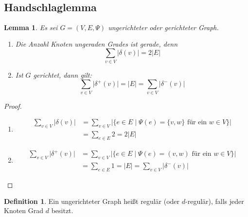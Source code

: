 \documentclass[a4paper,12pt]{article}
\newtheorem{lemma}[axiom]{Lemma}
\theoremstyle{definition}
\newtheorem{definition}[axiom]{Definition}
\begin{document}
	\subsection{Handschlaglemma}
	\begin{lemma}
		Es sei $G = (V, E, \Psi)$ ungerichteter oder gerichteter Graph.
		\begin{enumerate}[label=(\alph*)]
			\item Die Anzahl Knoten ungeraden Grades ist gerade, denn
			\[
				\sum_{v \in V} \lvert \delta(v) \rvert = 2 \lvert E \rvert
			\]
			\item Ist $G$ gerichtet, dann gilt:
			\[
				\sum_{v \in V} \lvert \delta^+(v) \rvert = \lvert E \rvert = \sum_{v \in V} \lvert \delta^-(v) \rvert
			\]
		\end{enumerate}
	\end{lemma}
	\begin{proof}
		\begin{enumerate}[label=(\alph*)]
			\item 
			\begin{align*}
				\sum_{v \in V} \lvert \delta(v) \rvert &= \sum_{v \in V} \big\lvert \{e \in E \mid \Psi(e) = \{v, w\} \text{ für ein } w \in V\} \big\rvert\\
				&= \sum_{e \in E}2  = 2 \lvert E \rvert 
			\end{align*}
			\item 
			\begin{align*}
				\sum_{v \in V}\lvert \delta^+(v) \rvert &= \sum_{v \in V} \lvert \{e \in E \mid \Psi(e) = (v, w) \text{ für ein } w \in V\}\rvert\\
				&= \sum_{e \in E} 1 = \lvert E \rvert = \sum_{v \in V}\lvert \delta^-(v) \rvert
			\end{align*}
		\end{enumerate}
	\end{proof}
	\begin{definition}
		Ein ungerichteter Graph heißt regulär (oder $d$-regulär), falls jeder Knoten Grad $d$ besitzt.
	\end{definition}
\end{document}
